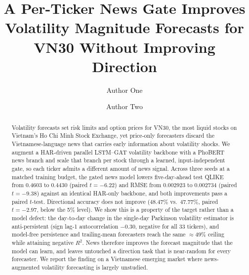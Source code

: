 \documentclass[runningheads]{llncs}
\newcommand{\qlikeHAR}{0.4603}
\newcommand{\qlikeNews}{0.4430}
\newcommand{\qliketstat}{-6.22}
\newcommand{\rmseHAR}{0.002923}
\newcommand{\rmseNews}{0.002734}
\newcommand{\rmsetstat}{-9.38}
\newcommand{\diraccHAR}{48.47}
\newcommand{\diraccNews}{47.77}
\newcommand{\diracctstat}{-2.97}
\newcommand{\ntick}{33}
\begin{document}
%
\title{A Per-Ticker News Gate Improves Volatility Magnitude Forecasts for VN30 Without Improving Direction}
%
%
\author{Author One \and Author Two}
%
%
\maketitle
%
\begin{abstract}
Volatility forecasts set risk limits and option prices for VN30, the most liquid stocks on
Vietnam's Ho Chi Minh Stock Exchange, yet price-only forecasters discard the Vietnamese-language news that
carries early information about volatility shocks. We augment a HAR-driven parallel LSTM--GAT
volatility backbone with a PhoBERT news branch and scale that branch per stock through a learned,
input-independent gate, so each ticker admits a different amount of news signal. Across three seeds
at a matched training budget, the gated news model lowers five-day-ahead test QLIKE from
\qlikeHAR{} to \qlikeNews{} (paired $t=\qliketstat$) and RMSE from \rmseHAR{} to \rmseNews{}
(paired $t=\rmsetstat$) against an identical HAR-only backbone, and both improvements pass a paired
$t$-test. Directional accuracy does not improve (\diraccHAR\% vs.\ \diraccNews\%, paired
$t=\diracctstat$, below the 5\% level). We show this is a property of the target rather than a model
defect: the day-to-day change in the single-day Parkinson volatility estimator is anti-persistent
(sign lag-1 autocorrelation $-0.30$, negative for all \ntick{} tickers), and model-free persistence
and trailing-mean forecasters reach the same $\approx 49\%$ ceiling while attaining negative
$R^2$. News therefore improves the forecast magnitude that the model can learn, and leaves
untouched a direction task that is near-random for every forecaster. We report the finding on a
Vietnamese emerging market where news-augmented volatility forecasting is largely unstudied.

\end{abstract}
%
\end{document}
